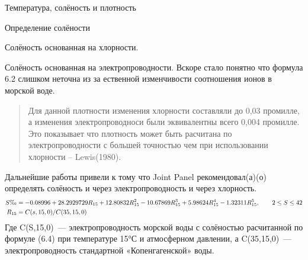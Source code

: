 \begin{chapter}{Температура, солёность и плотность}
\begin{section}{Определение солёности}
\begin{paragraph}{Солёность основанная на хлорности.}
\end{paragraph}

\begin{paragraph}{Солёность основанная на электропроводности.}
Вскоре стало понятно что формула 6.2 слишком неточна из за ественной
изменчивости соотношения ионов в морской воде.
\begin{quotation}
Для данной плотности изменения хлорности составляли до 0,03 промилле,
а изменения электропроводноси были эквивалентны всего 0,004
промилле. Это показывает что плотность может быть расчитана по
электропроводности с большей точностью чем при использовании
хлорности -- Lewis(1980).
\end{quotation}
Дальнейшие работы привели к тому что Joint Panel рекомендовал(а)(о)
определять солёность и через электропроводность и через хлорность.
\begin{subequations}
\begin{align}
S\ppt &= -0.08996 + 28.2929729R_{15} + 12.80832 R_{15}^2-10.67869R_{15}^3 
       + 5.98624R_{15}^4 - 1.32311R_{15}^5, \qquad 2 \le S \le 42 \\
R_{15} & =C(s,15,0)/C(35,15,0)
\end{align}
\end{subequations}
Где C(S,15,0)~--- электропроводность морской воды с солёностью
расчитанной по формуле (6.4) при температуре 15°С и атмосферном
давлении, а C(35,15,0)~--- электропроводность стандартной
«Копенгагенской» воды.
%

\end{paragraph}
\end{section}
\end{chapter}
